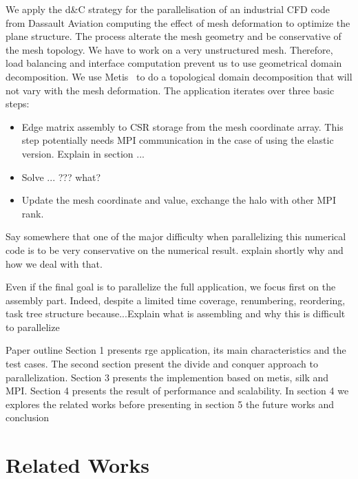 \documentclass{IOS-Book-Article}
\begin{document}
We apply the d\&C strategy for the parallelisation of an industrial CFD code from Dassault Aviation computing the effect of mesh deformation to optimize the plane structure.
The process alterate the mesh geometry and be conservative of the mesh topology.  We have to work on a very unstructured mesh. Therefore, load balancing and interface
computation prevent us to use geometrical domain decomposition.
We use Metis~\cite{Metis} to do a topological domain decomposition that will not vary with the mesh deformation.
The application iterates over three basic steps:
\begin{itemize}
\item Edge matrix assembly to CSR storage from the mesh coordinate array. This step potentially needs MPI communication in the case of using the elastic version.
Explain in section ...
\item Solve ... ??? what?
\item Update the mesh coordinate and value, exchange the halo with other MPI rank.
\end{itemize}
Say somewhere that one of the major difficulty when parallelizing this numerical code is to be very conservative on the numerical result. explain shortly why and how we deal
with that.


Even if the final goal is to parallelize the full application, we focus first on the assembly part. Indeed, despite a limited time coverage, renumbering, reordering,
task tree structure because...Explain what is assembling and why this is difficult to parallelize



Paper outline
Section 1 presents rge application, its main characteristics and the test cases.
The second section present the divide and conquer approach to parallelization. 
Section 3 presents the implemention based on metis, silk and MPI.
Section 4 presents the result of performance and scalability. 
In section 4 we explores the related works before presenting in section 5 the future works and conclusion

\section{Related Works}
\end{document}
